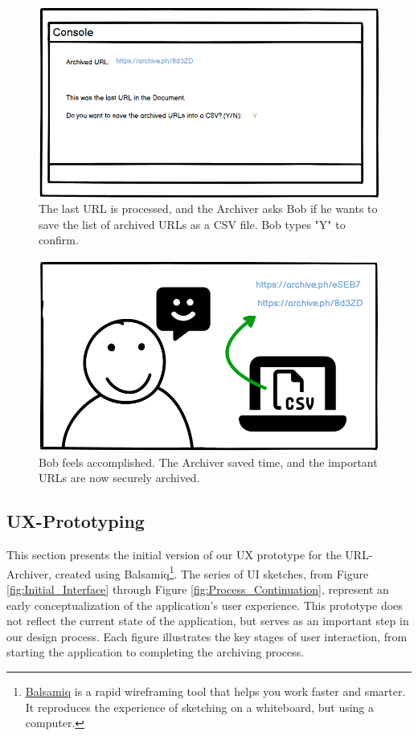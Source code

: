 \begin{figure}[h!]
    \centering
    \includegraphics[width=1\textwidth]{pictures/Story Board/StoryBoard_7}
    \caption{The last URL is processed, and the Archiver asks Bob if he wants to save the list of archived URLs as a CSV file. Bob types "Y" to confirm.}
    \label{fig:StoryBoard_7}
\end{figure}
\begin{figure}[h!]
    \centering
    \includegraphics[width=1\textwidth]{pictures/Story Board/StoryBoard_8}
    \caption{Bob feels accomplished. The Archiver saved time, and the important URLs are now securely archived.}
    \label{fig:StoryBoard_8}
\end{figure}
\clearpage

\subsection{UX-Prototyping}
This section presents the initial version of our UX prototype for the URL-Archiver, created using Balsamiq\footnote{\href{https://balsamiq.com/}{Balsamiq} is a rapid wireframing tool that helps you work faster and smarter. It reproduces the experience of sketching on a whiteboard, but using a computer.}.
The series of UI sketches, from Figure \ref{fig:Initial_Interface} through Figure \ref{fig:Process_Continuation}, represent an early conceptualization of the application's user experience.
This prototype does not reflect the current state of the application, but serves as an important step in our design process.
Each figure illustrates the key stages of user interaction, from starting the application to completing the archiving process.

